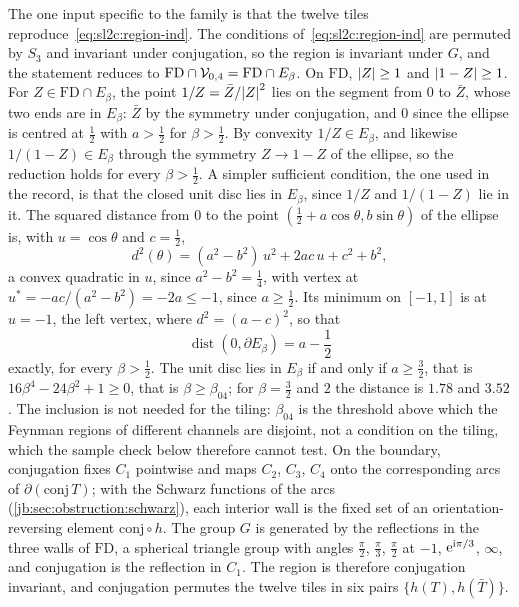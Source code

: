 The one input specific to the family is that the twelve tiles reproduce~\eqref{eq:sl2c:region-ind}.
The conditions of~\eqref{eq:sl2c:region-ind} are permuted by $S_3$ and invariant under conjugation, so the region is invariant under $G$, and the statement reduces to $\mathrm{FD} \cap {\mathcal{V}}_{0,4} = \mathrm{FD} \cap E_\beta$.
On $\mathrm{FD}$, ${|Z|} \ge 1$ and ${|1 - Z|} \ge 1$.
For $Z \in \mathrm{FD} \cap E_\beta$, the point $1 / Z = \bar Z / {|Z|}^2$ lies on the segment from $0$ to $\bar Z$, whose two ends are in $E_\beta$: $\bar Z$ by the symmetry under conjugation, and $0$ since the ellipse is centred at $\frac{1}{2}$ with $a > \frac{1}{2}$ for $\beta > \frac{1}{2}$.
By convexity $1 / Z \in E_\beta$, and likewise $1 / (1 - Z) \in E_\beta$ through the symmetry $Z \to 1 - Z$ of the ellipse, so the reduction holds for every $\beta > \frac{1}{2}$.
A simpler sufficient condition, the one used in the record, is that the closed unit disc lies in $E_\beta$, since $1 / Z$ and $1 / (1 - Z)$ lie in it.
The squared distance from $0$ to the point $(\frac{1}{2} + a \cos \theta, b \sin \theta)$ of the ellipse is, with $u = \cos \theta$ and $c = \frac{1}{2}$,
\begin{equation}
  d^2(\theta)
    = (a^2 - b^2) \, u^2 + 2 a c \, u + c^2 + b^2,
\end{equation}
a convex quadratic in $u$, since $a^2 - b^2 = \frac{1}{4}$, with vertex at $u^* = - a c / (a^2 - b^2) = - 2 a \le - 1$, since $a \ge \frac{1}{2}$.
Its minimum on $[-1, 1]$ is at $u = -1$, the left vertex, where $d^2 = (a - c)^2$, so that
\begin{equation}
  \operatorname{dist}(0, \partial E_\beta)
    = a - \frac{1}{2}
\end{equation}
exactly, for every $\beta > \frac{1}{2}$.
The unit disc lies in $E_\beta$ if and only if $a \ge \frac{3}{2}$, that is $16 \beta^4 - 24 \beta^2 + 1 \ge 0$, that is $\beta \ge \beta_{04}$; for $\beta = \frac{3}{2}$ and $2$ the distance is $1.78$ and $3.52$.
The inclusion is not needed for the tiling: $\beta_{04}$ is the threshold above which the Feynman regions of different channels are disjoint, not a condition on the tiling, which the sample check below therefore cannot test.
On the boundary, conjugation fixes $C_1$ pointwise and maps $C_2$, $C_3$, $C_4$ onto the corresponding arcs of $\partial(\mathrm{conj} \, T)$; with the Schwarz functions of the arcs (\cref{jb:sec:obstruction:schwarz}), each interior wall is the fixed set of an orientation-reversing element $\mathrm{conj} \circ h$.
The group $G$ is generated by the reflections in the three walls of $\mathrm{FD}$, a spherical triangle group with angles $\frac{\pi}{2}$, $\frac{\pi}{3}$, $\frac{\pi}{2}$ at $-1$, $\mathrm{e}^{\mathrm{i} \pi / 3}$, $\infty$, and conjugation is the reflection in $C_1$.
The region is therefore conjugation invariant, and conjugation permutes the twelve tiles in six pairs $\{ h(T), h(\bar T) \}$.

